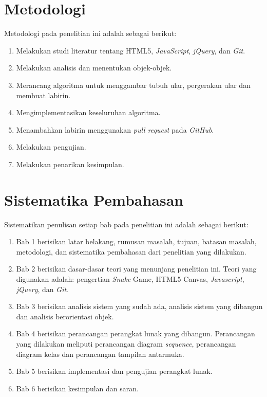 \section{Metodologi}
\label{sec:metlit}
Metodologi pada penelitian ini adalah sebagai berikut:
\begin{enumerate}
	\item Melakukan studi literatur tentang HTML5, \textit{JavaScript}, \textit{jQuery}, dan \textit{Git}.
	\item Melakukan analisis dan menentukan objek-objek.
	\item Merancang algoritma untuk menggambar tubuh ular, pergerakan ular dan membuat labirin.
	\item Mengimplementasikan keseluruhan algoritma.
	\item Menambahkan labirin menggunakan \textit{pull request} pada \textit{GitHub}.
	\item Melakukan pengujian.
	\item Melakukan penarikan kesimpulan. 
\end{enumerate}


\section{Sistematika Pembahasan}
\label{sec:sispem}
Sistematikan penulisan setiap bab pada penelitian ini adalah sebagai berikut:
\begin{enumerate}
	\item Bab 1 berisikan latar belakang, rumusan masalah, tujuan, batasan masalah, metodologi, dan sistematika pembahasan dari penelitian yang dilakukan.
	\item Bab 2 berisikan dasar-dasar teori yang menunjang penelitian ini. Teori yang digunakan adalah: pengertian \textit{Snake} Game, HTML5 Canvas, \textit{Javascript}, \textit{jQuery}, dan \textit{Git}.
	\item Bab 3 berisikan analisis sistem yang sudah ada, analisis sistem yang dibangun dan analisis berorientasi objek.
	\item Bab 4 berisikan perancangan perangkat lunak yang dibangun. Perancangan yang dilakukan meliputi perancangan diagram \textit{sequence}, perancangan diagram kelas dan perancangan tampilan antarmuka.
	\item Bab 5 berisikan implementasi dan pengujian perangkat lunak.
	\item Bab 6 berisikan kesimpulan dan saran.
\end{enumerate}